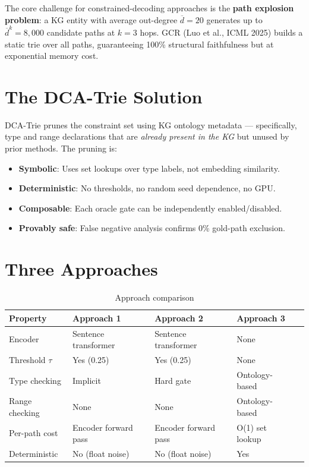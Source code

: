 \documentclass[11pt,a4paper,oneside,openany]{book}
\theoremstyle{definition}
\begin{document}
The core challenge for constrained-decoding approaches is the \textbf{path explosion problem}: a KG entity with average out-degree $\overline{d} = 20$ generates up to $\overline{d}^k = 8{,}000$ candidate paths at $k = 3$ hops. GCR (Luo et al., ICML 2025) builds a static trie over all paths, guaranteeing 100\% structural faithfulness but at exponential memory cost.

\section{The DCA-Trie Solution}

DCA-Trie prunes the constraint set using KG ontology metadata --- specifically, type and range declarations that are \emph{already present in the KG} but unused by prior methods. The pruning is:

\begin{itemize}
	\item \textbf{Symbolic}: Uses set lookups over type labels, not embedding similarity.
	\item \textbf{Deterministic}: No thresholds, no random seed dependence, no GPU.
	\item \textbf{Composable}: Each oracle gate can be independently enabled/disabled.
	\item \textbf{Provably safe}: False negative analysis confirms 0\% gold-path exclusion.
\end{itemize}

\section{Three Approaches}

\begin{table}[h]
	\centering
	\caption{Approach comparison}
	\label{tab:approaches}
	\begin{tabular}{lp{3cm}p{3cm}p{3cm}p{2.5cm}}
		\toprule
		Property         & Approach 1           & Approach 2           & Approach 3      \\
		\midrule
		Encoder          & Sentence transformer & Sentence transformer & None            \\
		Threshold $\tau$ & Yes (0.25)           & Yes (0.25)           & None            \\
		Type checking    & Implicit             & Hard gate            & Ontology-based  \\
		Range checking   & None                 & None                 & Ontology-based  \\
		Per-path cost    & Encoder forward pass & Encoder forward pass & O(1) set lookup \\
		Deterministic    & No (float noise)     & No (float noise)     & Yes             \\
		\bottomrule
	\end{tabular}
\end{table}
\end{document}
